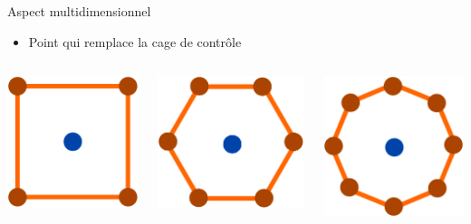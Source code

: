 \documentclass[xcolor=x11names,compress]{beamer}
\renewcommand{\(}{\begin{columns}} \renewcommand{\)}{\end{columns}}
\newcommand{\<}[1]{\begin{column}{#1}} \renewcommand{\>}{\end{column}}
\begin{document}
\begin{frame}{Aspect multidimensionnel}
  \begin{itemize}
    \item Point qui remplace la cage de contrôle
  \end{itemize}
  \begin{columns}[t]
    \begin{column}{0.3\textwidth}
      \centering
      \includegraphics[scale=0.4]{OutilPoint4}
    \end{column}
    \begin{column}{0.3\textwidth}
      \centering
      \includegraphics[scale=0.4]{OutilPoint6}
    \end{column}
    \begin{column}{0.3\textwidth}
      \centering
      \includegraphics[scale=0.4]{OutilPoint8}

\end{column}
\end{columns}
\end{frame}
\end{document}
